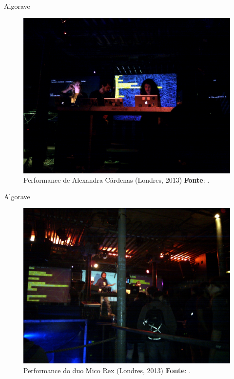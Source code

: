 \documentclass[aspectratio=169]{beamer}
\begin{document}
\begin{frame}{Algorave}
\begin{figure}[h]
  \centering
  \includegraphics[scale=0.2]{imagens/cardenas.jpg}
  \caption{Performance de Alexandra Cárdenas (Londres, 2013) \textbf{Fonte}: .}
  \label{fig:cardenas}
\end{figure}
\end{frame}

\begin{frame}{Algorave}
\begin{figure}[!h]
  \centering
  \includegraphics[scale=0.2]{imagens/algorave.jpg}
  \caption{Performance do duo Mico Rex (Londres, 2013) \textbf{Fonte}: .}
  \label{fig:micorex}
\end{figure}
\end{frame}
\end{document}
